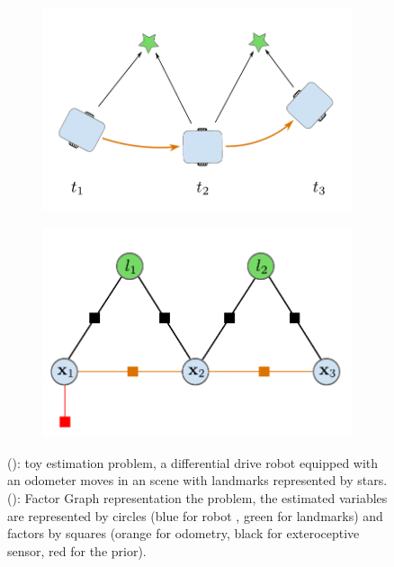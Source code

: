 \begin{figure}[h]
    \centering
    \begin{subfigure}{.49\linewidth}
        \centering
        \includegraphics[width=\textwidth]{figures/toy_example.pdf}
        \caption{\label{fig:toy_problem}}
    \end{subfigure}%
    \hfill
    \begin{subfigure}{.49\linewidth}
        \centering
        \includegraphics[width=\textwidth]{figures/toy_factor.pdf}
        \caption{\label{fig:toy_factor}}
    \end{subfigure}%
    \caption{(): toy estimation problem, a differential drive robot equipped with an odometer moves in 
    an scene with landmarks represented by stars. (): Factor Graph representation the problem, the estimated variables are represented by circles 
    (blue for robot \keyframes, green for landmarks) and factors by squares (orange for odometry, black for exteroceptive sensor, red for the prior).}
\end{figure}

